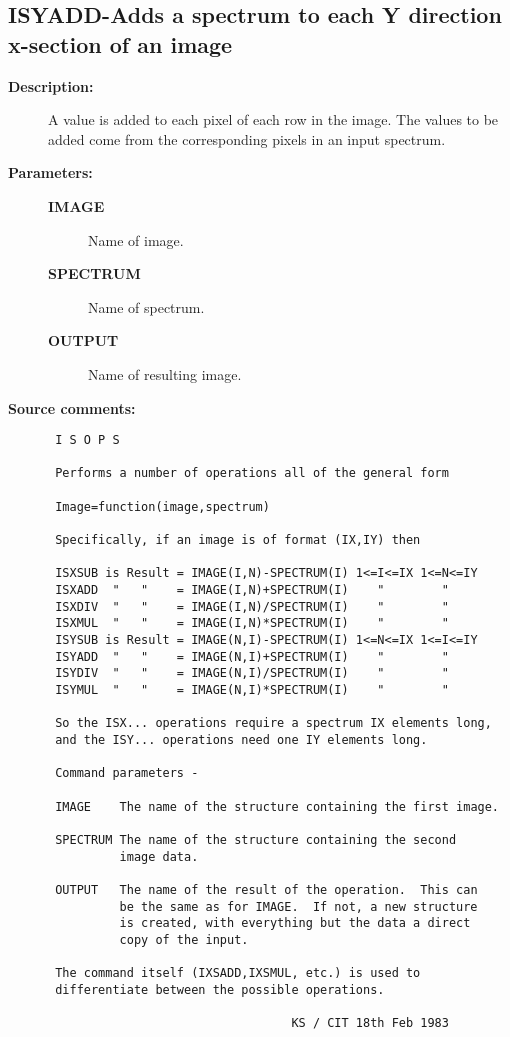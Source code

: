 \subsection{ISYADD-\label{ISYADD}Adds a spectrum to each Y direction x-section of an image}
\begin{description}

\item [{\bf Description:}]
 A value is added to each pixel of each row in the image.
 The values to be added come from the corresponding pixels in
 an input spectrum.

\item [{\bf Parameters:}]
\begin{description}
\item [{\bf IMAGE}]
 Name of image.
\item [{\bf SPECTRUM}]
 Name of spectrum.
\item [{\bf OUTPUT}]
 Name of resulting image.
\end{description}

\item [{\bf Source comments:}]
\begin{verbatim}
 I S O P S

 Performs a number of operations all of the general form

 Image=function(image,spectrum)

 Specifically, if an image is of format (IX,IY) then

 ISXSUB is Result = IMAGE(I,N)-SPECTRUM(I) 1<=I<=IX 1<=N<=IY
 ISXADD  "   "    = IMAGE(I,N)+SPECTRUM(I)    "        "
 ISXDIV  "   "    = IMAGE(I,N)/SPECTRUM(I)    "        "
 ISXMUL  "   "    = IMAGE(I,N)*SPECTRUM(I)    "        "
 ISYSUB is Result = IMAGE(N,I)-SPECTRUM(I) 1<=N<=IX 1<=I<=IY
 ISYADD  "   "    = IMAGE(N,I)+SPECTRUM(I)    "        "
 ISYDIV  "   "    = IMAGE(N,I)/SPECTRUM(I)    "        "
 ISYMUL  "   "    = IMAGE(N,I)*SPECTRUM(I)    "        "

 So the ISX... operations require a spectrum IX elements long,
 and the ISY... operations need one IY elements long.

 Command parameters -

 IMAGE    The name of the structure containing the first image.

 SPECTRUM The name of the structure containing the second
          image data.

 OUTPUT   The name of the result of the operation.  This can
          be the same as for IMAGE.  If not, a new structure
          is created, with everything but the data a direct
          copy of the input.

 The command itself (IXSADD,IXSMUL, etc.) is used to
 differentiate between the possible operations.

                                  KS / CIT 18th Feb 1983
\end{verbatim}
\end{description}
